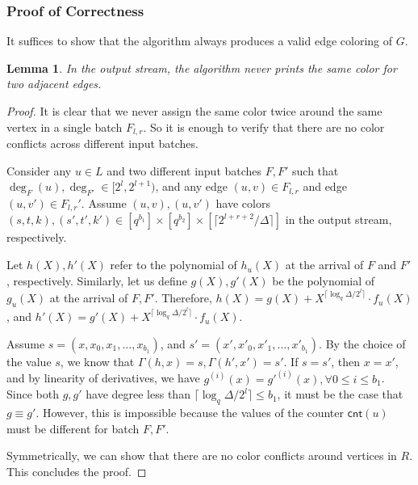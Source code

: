 \documentclass[11pt,a4paper]{article}
\newtheorem{lemma}{Lemma}[section]
\newcommand{\ceil}[1]{\lceil #1 \rceil}
\newcommand{\cnt}{\mathsf{cnt}}
\begin{document}
\subsubsection{Proof of Correctness}
It suffices to show that the algorithm always produces a valid edge coloring of $G$.
\begin{lemma}
	In the output stream, the algorithm never prints the same color for two adjacent edges.
\end{lemma}
\begin{proof}
	It is clear that we never assign the same color twice around the same vertex in a single batch $F_{l, r}$. So it is enough to verify that there are no color conflicts across different input batches.
	
	Consider any $u\in L$ and two different input batches $F, F'$ such that $\deg_F(u), \deg_{F'}\in [2^l, 2^{l+1})$, and any edge $(u, v)\in F_{l, r}$ and edge $(u, v')\in F_{l, r}'$. Assume $(u, v), (u, v')$ have colors $(s, t, k), (s', t', k')\in [q^{b_1}]\times [q^{b_2}]\times [\ceil{2^{l+r+2} / \Delta}]$ in the output stream, respectively.
	
	Let $h(X), h'(X)$ refer to the polynomial of $h_u(X)$ at the arrival of $F$ and $F'$, respectively. Similarly, let us define $g(X), g'(X)$ be the polynomial of $g_u(X)$ at the arrival of $F, F'$. Therefore, $h(X) = g(X) + X^{\ceil{\log_q\Delta / 2^l}}\cdot f_u(X)$, and $h'(X) = g'(X) + X^{\ceil{\log_q\Delta / 2^l}}\cdot f_u(X)$.
	
	Assume $s = (x, x_0, x_1, \ldots, x_{b_1})$, and $s' = (x', x'_0, x'_1, \ldots, x'_{b_1})$. By the choice of the value $s$, we know that $\Gamma(h, x) = s, \Gamma(h', x') = s'$. If $s = s'$, then $x = x'$, and by linearity of derivatives, we have $g^{(i)}(x) = g'^{(i)}(x), \forall 0\leq i\leq b_1$. Since both $g, g'$ have degree less than $\ceil{\log_q \Delta/2^l} \leq b_1$, it must be the case that $g \equiv g'$. However, this is impossible because the values of the counter $\cnt(u)$ must be different for batch $F, F'$.
	
	Symmetrically, we can show that there are no color conflicts around vertices in $R$. This concludes the proof.
\end{proof}
\end{document}
